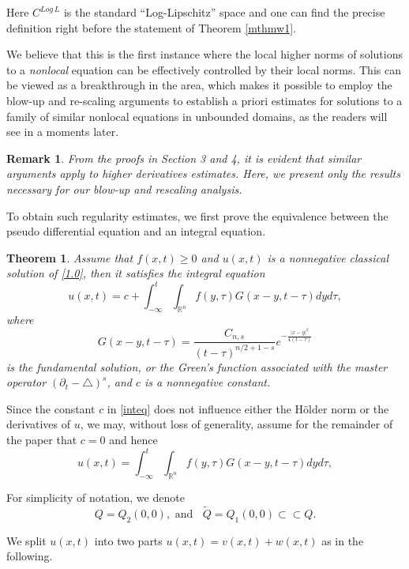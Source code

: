 \documentclass[12pt]{article}
\newtheorem{mthm}{Theorem}
\newtheorem{mrem}{Remark}
\theoremstyle{remark}
\numberwithin{equation}{section}
\newcommand{\lap}{\mbox{$\triangle$}}
\begin{document}
Here $C^{Log \, L}$ is the standard ``Log-Lipschitz'' space and one can find the precise definition right before the statement of Theorem
\ref{mthmw1}.



We believe that this is the first instance where the local higher norms of solutions to a {\em nonlocal} equation can be effectively controlled by their local norms. This can be viewed as a breakthrough in the area, which makes it possible to employ the blow-up and re-scaling arguments to
establish a priori estimates for solutions to a family of similar nonlocal equations in unbounded domains, as the readers will see in a moments later.

\begin{mrem}
From the proofs in Section 3 and 4, it is evident that similar arguments apply to higher derivatives estimates. Here, we present only  the results necessary for our blow-up and rescaling analysis.
\end{mrem}

To obtain such regularity estimates, we first prove the equivalence between the pseudo differential equation and an integral equation.
\begin{mthm} \label{mthm1}
Assume that $f(x,t) \geq 0$ and  $u(x,t)$ is a nonnegative classical solution of \eqref{1.0}, then it satisfies the integral equation
\begin{equation} \label{inteq}
u(x,t) = c + \int_{-\infty}^t \int_{\mathbb{R}^n} f(y,\tau) G(x-y, t-\tau) dy d\tau,
\end{equation}
where
$$G(x-y, t-\tau) = \frac{C_{n,s}}{(t-\tau)^{n/2+1-s}} e^{-\frac{|x-y|^2}{4(t-\tau)}}$$
is the fundamental solution, or the Green's function associated with the master operator $(\partial_t - \lap)^s$, and $c$ is a nonnegative constant.
\end{mthm}

Since the constant $c$ in \eqref{inteq} does not influence either the H\"{o}lder norm or the derivatives of $u$, we may, without loss of generality, assume for the remainder of the paper that $c=0$ and hence
\begin{equation} \label{inteq1}
u(x,t) = \int_{-\infty}^t \int_{\mathbb{R}^n} f(y,\tau) G(x-y, t-\tau) dy d\tau,
\end{equation}

For simplicity of notation, we denote
$$ Q = Q_2(0,0), \mbox{ and } \; \; \tilde{Q} = Q_1(0,0) \subset \subset Q.$$

We split $u(x,t)$ into two parts $u(x,t)=v(x,t) + w(x,t)$ as  in the following.
\end{document}
